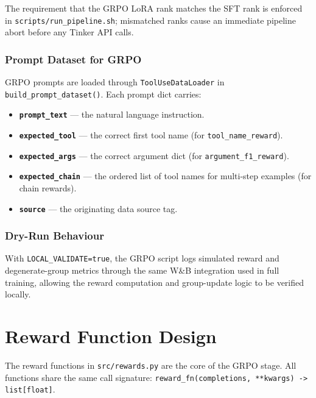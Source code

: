 \documentclass[12pt, a4paper]{article}
\begin{document}
The requirement that the GRPO LoRA rank matches the SFT rank is enforced in
\texttt{scripts/run\_pipeline.sh}; mismatched ranks cause an immediate
pipeline abort before any Tinker API calls.

\subsubsection{Prompt Dataset for GRPO}

GRPO prompts are loaded through \texttt{ToolUseDataLoader} in
\texttt{build\_prompt\_dataset()}. Each prompt dict carries:

\begin{itemize}[leftmargin=1.5em, itemsep=3pt]
  \item \textbf{\texttt{prompt\_text}} --- the natural language instruction.
  \item \textbf{\texttt{expected\_tool}} --- the correct first tool name (for
    \texttt{tool\_name\_reward}).
  \item \textbf{\texttt{expected\_args}} --- the correct argument dict (for
    \texttt{argument\_f1\_reward}).
  \item \textbf{\texttt{expected\_chain}} --- the ordered list of tool names
    for multi-step examples (for chain rewards).
  \item \textbf{\texttt{source}} --- the originating data source tag.
\end{itemize}

\subsubsection{Dry-Run Behaviour}

With \texttt{LOCAL\_VALIDATE=true}, the GRPO script logs simulated reward and
degenerate-group metrics through the same W\&B integration used in full training,
allowing the reward computation and group-update logic to be verified locally.

\section{Reward Function Design}

The reward functions in \texttt{src/rewards.py} are the core of the GRPO stage.
All functions share the same call signature:
\texttt{reward\_fn(completions, **kwargs) -> list[float]}.
\end{document}
